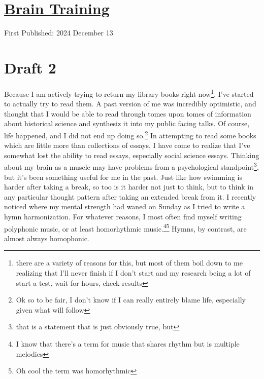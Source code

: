 \documentclass[12pt]{article}[titlepage]
\renewcommand{\,}{\textsuperscript{,}}
\begin{document}
\doublespacing

\section{\href{brain-training.tex}{Brain Training}}
First Published: 2024 December 13

\section{Draft 2}
Because I am actively trying to return my library books right now\footnote{there are a variety of reasons for this, but most of them boil down to me realizing that I'll never finish if I don't start and my research being a lot of start a test, wait for hours, check results}, I've started to actually try to read them.
A past version of me was incredibly optimistic, and thought that I would be able to read through tomes upon tomes of information about historical science and synthesiz it into my public facing talks.
Of course, life happened, and I did not end up doing so.\footnote{Ok so to be fair, I don't know if I can really entirely blame life, especially given what will follow}
In attempting to read some books which are little more than collections of essays, I have come to realize that I've somewhat lost the ability to read essays, especially social science essays.
Thinking about my brain as a muscle may have problems from a psychological standpoint\footnote{that is a statement that is just obviously true, but}, but it's been something useful for me in the past.
Just like how swimming is harder after taking a break, so too is it harder not just to think, but to think in any particular thought pattern after taking an extended break from it.
I recently noticed where my mental strength had waned on Sunday as I tried to write a hymn harmonization.
For whatever reasons, I most often find myself writing polyphonic music, or at least homorhythmic music.\footnote{I know that there's a term for music that shares rhythm but is multiple melodies}\footnote{Oh cool the term was homorhythmic}
Hymns, by contrast, are almost always homophonic.
\end{document}
